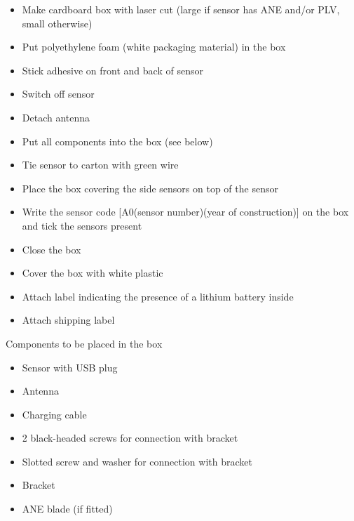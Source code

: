 \begin{itemize}
  \item Make cardboard box with laser cut (large if sensor has ANE and/or PLV, small otherwise)
  \item Put polyethylene foam (white packaging material) in the box
  \item Stick adhesive on front and back of sensor
  \item Switch off sensor
  \item Detach antenna
  \item Put all components into the box (see below)
  \item Tie sensor to carton with green wire
  \item Place the box covering the side sensors on top of the sensor
  \item Write the sensor code [A0(sensor number)(year of construction)] on the box and tick the sensors present
    \item Close the box
    \item Cover the box with white plastic
    \item Attach label indicating the presence of a lithium battery inside
    \item Attach shipping label
\end{itemize}

  Components to be placed in the box
\begin{itemize}
    \item Sensor with USB plug
    \item Antenna
    \item Charging cable
    \item 2 black-headed screws for connection with bracket
    \item Slotted screw and washer for connection with bracket
    \item Bracket
    \item ANE blade (if fitted)
  
\end{itemize}
        